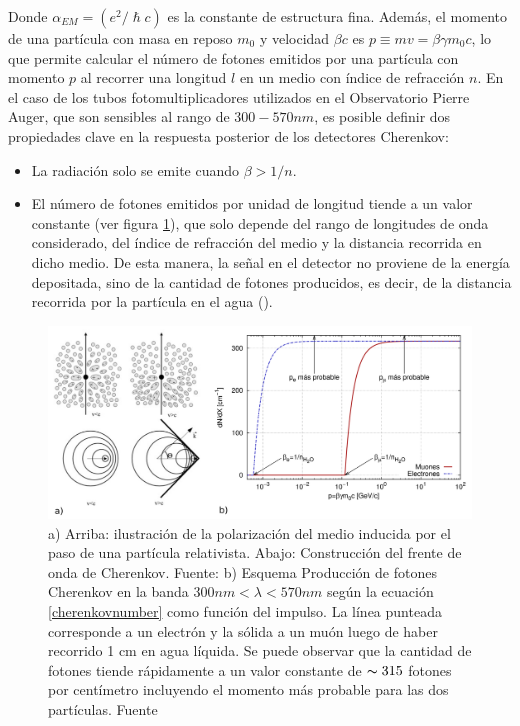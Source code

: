 Donde $\alpha_{EM}=(e^2/ \hslash c)$ es la constante de estructura fina. Además, el momento de una partícula con masa en reposo $m_{0}$ y velocidad $\beta c$ es $p\equiv mv = \beta \gamma m_{0}c$, lo que permite calcular el número de fotones emitidos por una partícula con momento $p$ al recorrer una longitud $l$ en un medio con índice de refracción $n$. En el caso de los tubos fotomultiplicadores utilizados en el Observatorio Pierre Auger, que son sensibles al rango de $300 - 570nm$, es posible definir dos propiedades clave en la respuesta posterior de los detectores Cherenkov:
\begin{itemize}
\item La radiación solo se emite cuando $\beta>1/n$.
\item El número de fotones emitidos por unidad de longitud tiende a un valor constante (ver figura \ref{stopping_cherenkov}), que solo depende del rango de longitudes de onda considerado, del índice de refracción del medio y la distancia recorrida en dicho medio. De esta manera, la señal en el detector no proviene de la energía depositada, sino de la cantidad de fotones producidos, es decir, de la distancia recorrida por la partícula en el agua (\cite{asorey}).
\end{itemize}
\begin{figure}
\centering
\includegraphics[width=1\textwidth]{Figs/cherenkov_stopping.png}
\caption{a) Arriba: ilustración de la polarización del medio inducida por el paso de una partícula relativista. Abajo: Construcción del frente de onda de Cherenkov. Fuente: \cite{deNaurois:2015oda} b) Esquema Producción de fotones Cherenkov en la banda $300 nm < \lambda < 570 nm$ según la ecuación \ref{cherenkovnumber} como función del impulso. La línea punteada corresponde a un electrón y la sólida a un muón luego de haber recorrido 1 cm en agua líquida. Se puede observar que la cantidad de fotones tiende rápidamente a un valor constante de $\thicksim 315$ fotones por centímetro incluyendo el momento más probable para las dos partículas. Fuente \cite{asorey}}
\label{stopping_cherenkov}
\end{figure}
